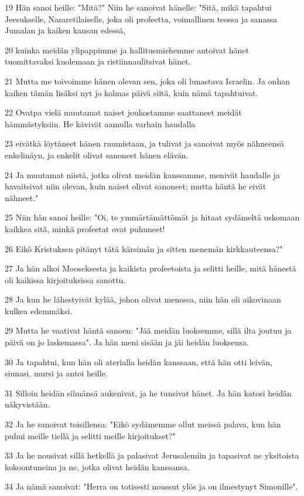 \par 19 Hän sanoi heille: "Mitä?" Niin he sanoivat hänelle: "Sitä, mikä tapahtui Jeesukselle, Nasaretilaiselle, joka oli profeetta, voimallinen teossa ja sanassa Jumalan ja kaiken kansan edessä,
\par 20 kuinka meidän ylipappimme ja hallitusmiehemme antoivat hänet tuomittavaksi kuolemaan ja ristiinnaulitsivat hänet.
\par 21 Mutta me toivoimme hänen olevan sen, joka oli lunastava Israelin. Ja onhan kaiken tämän lisäksi nyt jo kolmas päivä siitä, kuin nämä tapahtuivat.
\par 22 Ovatpa vielä muutamat naiset joukostamme saattaneet meidät hämmästyksiin. He kävivät aamulla varhain haudalla
\par 23 eivätkä löytäneet hänen ruumistaan, ja tulivat ja sanoivat myös nähneensä enkelinäyn, ja enkelit olivat sanoneet hänen elävän.
\par 24 Ja muutamat niistä, jotka olivat meidän kanssamme, menivät haudalle ja havaitsivat niin olevan, kuin naiset olivat sanoneet; mutta häntä he eivät nähneet."
\par 25 Niin hän sanoi heille: "Oi, te ymmärtämättömät ja hitaat sydämeltä uskomaan kaikkea sitä, minkä profeetat ovat puhuneet!
\par 26 Eikö Kristuksen pitänyt tätä kärsimän ja sitten menemän kirkkauteensa?"
\par 27 Ja hän alkoi Mooseksesta ja kaikista profeetoista ja selitti heille, mitä hänestä oli kaikissa kirjoituksissa sanottu.
\par 28 Ja kun he lähestyivät kylää, johon olivat menossa, niin hän oli aikovinaan kulkea edemmäksi.
\par 29 Mutta he vaativat häntä sanoen: "Jää meidän luoksemme, sillä ilta joutuu ja päivä on jo laskemassa". Ja hän meni sisään ja jäi heidän luoksensa.
\par 30 Ja tapahtui, kun hän oli aterialla heidän kanssaan, että hän otti leivän, siunasi, mursi ja antoi heille.
\par 31 Silloin heidän silmänsä aukenivat, ja he tunsivat hänet. Ja hän katosi heidän näkyvistään.
\par 32 Ja he sanoivat toisillensa: "Eikö sydämemme ollut meissä palava, kun hän puhui meille tiellä ja selitti meille kirjoitukset?"
\par 33 Ja he nousivat sillä hetkellä ja palasivat Jerusalemiin ja tapasivat ne yksitoista kokoontuneina ja ne, jotka olivat heidän kanssansa.
\par 34 Ja nämä sanoivat: "Herra on totisesti noussut ylös ja on ilmestynyt Simonille".
